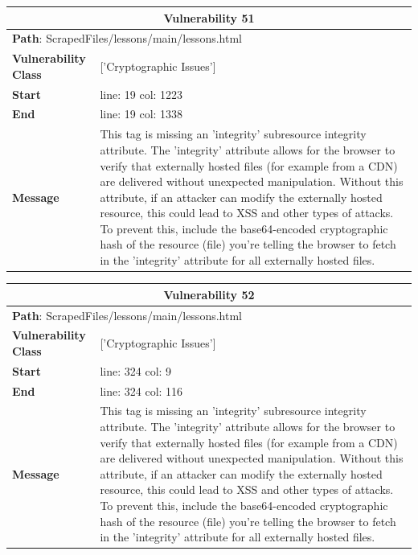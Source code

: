 \documentclass[12pt]{article}
\begin{document}
\vspace{0.7cm}
\FloatBarrier
\begin{table}[!h]
\centering
\renewcommand{\arraystretch}{1.3}
\begin{tabular}{|l|p{10cm}|}
\hline
\multicolumn{2}{|c|}{\textbf{Vulnerability 51}} \\
\hline
\multicolumn{2}{|l|}{\textbf{Path}: ScrapedFiles/lessons/main/lessons.html} \\
\hline
\textbf{Vulnerability Class} & ['Cryptographic Issues'] \\
\hline
\textbf{Start} & line: 19 \quad col: 1223 \\
\hline
\textbf{End} & line: 19 \quad col: 1338 \\
\hline
\textbf{Message} & This tag is missing an 'integrity' subresource integrity attribute. The 'integrity' attribute allows for the browser to verify that externally hosted files (for example from a CDN) are delivered without unexpected manipulation. Without this attribute, if an attacker can modify the externally hosted resource, this could lead to XSS and other types of attacks. To prevent this, include the base64-encoded cryptographic hash of the resource (file) you're telling the browser to fetch in the 'integrity' attribute for all externally hosted files. \\
\hline
\end{tabular}
\end{table}
\vspace{0.7cm}
\FloatBarrier
\begin{table}[!h]
\centering
\renewcommand{\arraystretch}{1.3}
\begin{tabular}{|l|p{10cm}|}
\hline
\multicolumn{2}{|c|}{\textbf{Vulnerability 52}} \\
\hline
\multicolumn{2}{|l|}{\textbf{Path}: ScrapedFiles/lessons/main/lessons.html} \\
\hline
\textbf{Vulnerability Class} & ['Cryptographic Issues'] \\
\hline
\textbf{Start} & line: 324 \quad col: 9 \\
\hline
\textbf{End} & line: 324 \quad col: 116 \\
\hline
\textbf{Message} & This tag is missing an 'integrity' subresource integrity attribute. The 'integrity' attribute allows for the browser to verify that externally hosted files (for example from a CDN) are delivered without unexpected manipulation. Without this attribute, if an attacker can modify the externally hosted resource, this could lead to XSS and other types of attacks. To prevent this, include the base64-encoded cryptographic hash of the resource (file) you're telling the browser to fetch in the 'integrity' attribute for all externally hosted files. \\
\hline
\end{tabular}
\end{table}
\end{document}
